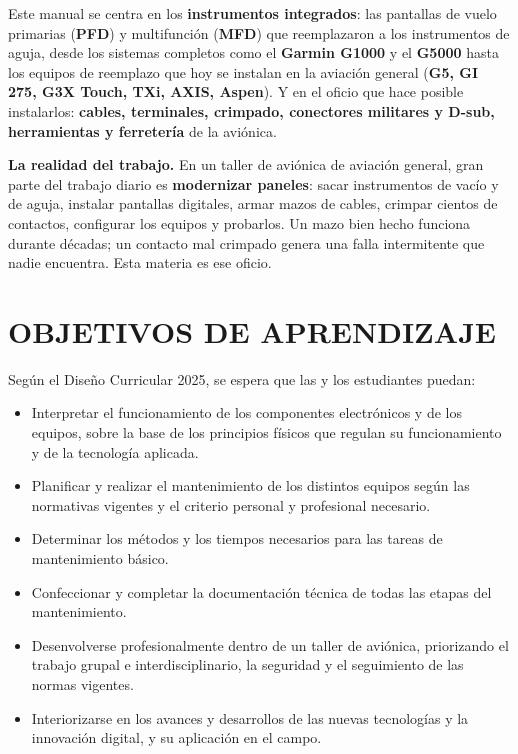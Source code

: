 Este manual se centra en los \textbf{instrumentos integrados}: las pantallas de vuelo primarias
(\textbf{PFD}) y multifunción (\textbf{MFD}) que reemplazaron a los instrumentos de aguja, desde
los sistemas completos como el \textbf{Garmin G1000} y el \textbf{G5000} hasta los equipos de
reemplazo que hoy se instalan en la aviación general (\textbf{G5, GI 275, G3X Touch, TXi, AXIS,
Aspen}). Y en el oficio que hace posible instalarlos: \textbf{cables, terminales, crimpado,
conectores militares y D-sub, herramientas y ferretería} de la aviónica.

\begin{recuadro}
\textbf{La realidad del trabajo.} En un taller de aviónica de aviación general, gran parte del
trabajo diario es \textbf{modernizar paneles}: sacar instrumentos de vacío y de aguja, instalar
pantallas digitales, armar mazos de cables, crimpar cientos de contactos, configurar los equipos y
probarlos. Un mazo bien hecho funciona durante décadas; un contacto mal crimpado genera una falla
intermitente que nadie encuentra. Esta materia es ese oficio.
\end{recuadro}

\section*{OBJETIVOS DE APRENDIZAJE}
Según el Diseño Curricular 2025, se espera que las y los estudiantes puedan:
\begin{itemize}
  \item Interpretar el funcionamiento de los componentes electrónicos y de los equipos, sobre la
        base de los principios físicos que regulan su funcionamiento y de la tecnología aplicada.
  \item Planificar y realizar el mantenimiento de los distintos equipos según las normativas
        vigentes y el criterio personal y profesional necesario.
  \item Determinar los métodos y los tiempos necesarios para las tareas de mantenimiento básico.
  \item Confeccionar y completar la documentación técnica de todas las etapas del mantenimiento.
  \item Desenvolverse profesionalmente dentro de un taller de aviónica, priorizando el trabajo
        grupal e interdisciplinario, la seguridad y el seguimiento de las normas vigentes.
  \item Interiorizarse en los avances y desarrollos de las nuevas tecnologías y la innovación
        digital, y su aplicación en el campo.
\end{itemize}


